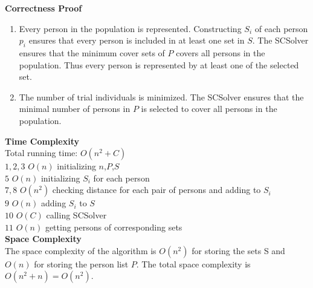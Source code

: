 \documentclass[11pt]{exam}
\begin{document}
\newpage
\noindent\textbf{Correctness Proof} \\
\begin{enumerate}
    \item Every person in the population is represented. Constructing $S_i$ of each person $p_i$ ensures that every person is included in at least one set in $S$. The SCSolver ensures that the minimum cover sets of $P$ covers all persons in the population. Thus every person is represented by at least one of the selected set.
    \item The number of trial individuals is minimized. The SCSolver ensures that the minimal number of persons in $P$ is selected to cover all persons in the population.
\end{enumerate}
\noindent\textbf{Time Complexity} \\
Total running time: $O(n^2+C)$\\
$1,2,3$ \indent $O(n)$ initializing $n$,$P$,$S$\\
$5$ \indent $O(n)$ initializing $S_i$ for each person\\
$7,8$ \indent $O(n^2)$ checking distance for each pair of persons and adding to $S_i$\\
$9$ \indent $O(n)$ adding $S_i$ to $S$\\
$10$ \indent $O(C)$ calling SCSolver\\
$11$ \indent $O(n)$ getting persons of corresponding sets\\

\noindent\textbf{Space Complexity} \\
The space complexity of the algorithm is $O(n^2)$ for storing the sets S and $O(n)$ for storing the person list $P$.
The total space complexity is $O(n^2+n)=O(n^2)$.
\end{document}
